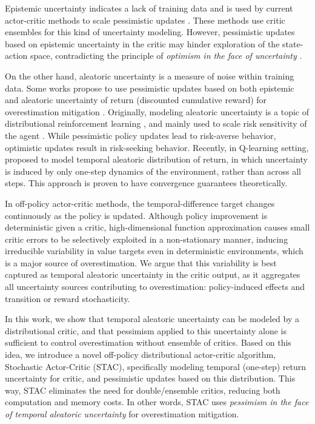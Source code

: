 \documentclass[10pt]{article} %
\begin{document}
Epistemic uncertainty indicates a lack of training data and is used by current actor-critic methods to scale pessimistic updates \citep{fujimoto2018addressing, haarnoja2018soft, kuznetsov2020controlling, moskovitz2021tactical, chen2021randomized, hiraoka2021dropout, zhang2024explorer}. These methods use critic ensembles for this kind of uncertainty modeling. However, pessimistic updates based on epistemic uncertainty in the critic may hinder exploration of the state-action space, contradicting the principle of \textit{optimism in the face of uncertainty} \citep{kocsis2006bandit, audibert2007tuning, azizzadenesheli2018efficient, ciosek2019better, o2023efficient, wu2023uncertainty}.

On the other hand, aleatoric uncertainty is a measure of noise within training data. Some works propose to use pessimistic updates based on both epistemic and aleatoric uncertainty of return (discounted cumulative reward) for overestimation mitigation \citep{kuznetsov2020controlling}. Originally, modeling aleatoric uncertainty is a topic of distributional reinforcement learning \citep{bellemare2017distributional, dabney2018distributional, kim2022efficient, duan2021distributional, duan2025distributional, ma2025dsac}, and mainly used to scale risk sensitivity of the agent \citep{tang2019worst, yang2021wcsac, theate2023risk, ma2025dsac}. While pessimistic policy updates lead to risk-averse behavior, optimistic updates result in risk-seeking behavior. Recently, in Q-learning setting, \citet{achab2023one} proposed to model temporal aleatoric distribution of return, in which uncertainty is induced by only one-step dynamics of the environment, rather than across all steps. This approach is proven to have convergence guarantees theoretically. 

In off-policy actor-critic methods, the temporal-difference target changes continuously as the policy is updated. Although policy improvement is deterministic given a critic, high-dimensional function approximation causes small critic errors to be selectively exploited in a non-stationary manner, inducing irreducible variability in value targets even in deterministic environments, which is a major source of overestimation. We argue that this variability is best captured as temporal aleatoric uncertainty in the critic output, as it aggregates all uncertainty sources contributing to overestimation: policy-induced effects and transition or reward stochasticity.

In this work, we show that temporal aleatoric uncertainty can be modeled by a distributional critic, and that pessimism applied to this uncertainty alone is sufficient to control overestimation without ensemble of critics. Based on this idea, we introduce a novel off-policy distributional actor-critic algorithm, Stochastic Actor-Critic (STAC), specifically modeling temporal (one-step) return uncertainty for critic, and pessimistic updates based on this distribution. This way, STAC eliminates the need for double/ensemble critics, reducing both computation and memory costs. In other words, STAC uses \textit{pessimism in the face of temporal aleatoric uncertainty} for overestimation mitigation.  
\end{document}
